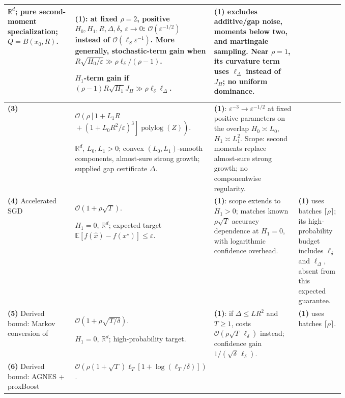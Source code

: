 \begin{table}[tp]
\begin{threeparttable}
\begin{tabularx}{\linewidth}{@{}>{\raggedright\arraybackslash}p{0.20\linewidth}>{\raggedright\arraybackslash}p{0.32\linewidth}>{\raggedright\arraybackslash}p{0.25\linewidth}>{\raggedright\arraybackslash}X@{}}
$\mathbb R^d$; pure second-moment specialization; $Q=B(x_0,R)$.
& \textbf{(1)}: at fixed $\rho=2$, positive $H_0,H_1,R,\Delta,\delta$, $\varepsilon\to0$: $\mathcal{O}(\varepsilon^{-1/2})$ instead of $\mathcal{O}(\ell_S\varepsilon^{-1})$. More generally, stochastic-term gain when $R\sqrt{H_0/\varepsilon}\gg\rho\ell_\delta/(\rho-1)$.\par
$H_1$-term gain if $(\rho-1)R\sqrt{H_1}J_H\gg\rho\ell_\delta\ell_\Delta$.
& \textbf{(1)} excludes additive/gap noise, moments below two, and martingale sampling. Near $\rho=1$, its curvature term uses $\ell_\Delta$ instead of $J_H$; no uniform dominance. \\
\midrule
\textbf{(3)} \citep[App.~I, Thm.~7, v1]{gssgDvinskikh2026}
& $\mathcal{O}\!\left(\rho\left[1+L_1R\right.\right.$\newline
$\left.\left.{}+(1+L_0R^2/\varepsilon)^3\right]\operatorname{polylog}(Z)\right)$.\par
$\mathbb R^d$, $L_0,L_1>0$; convex $(L_0,L_1)$-smooth components, almost-sure strong growth; supplied gap certificate $\Delta$.
& \textbf{(1)}: $\varepsilon^{-3}\to\varepsilon^{-1/2}$ at fixed positive parameters on the overlap $H_0\asymp L_0$, $H_1\asymp L_1^2$. Scope: second moments replace almost-sure strong growth; no componentwise regularity.
& \\
\midrule
\textbf{(4)} Accelerated SGD \citep[Thm.~2]{gssgVaswani2019}
& $\mathcal{O}(1+\rho\sqrt T)$.\par
$H_1=0$, $\mathbb R^d$; expected target $\mathbb E[f(\widehat x)-f(x^\star)]\le\varepsilon$.
& \textbf{(1)}: scope extends to $H_1>0$; matches known $\rho\sqrt T$ accuracy dependence at $H_1=0$, with logarithmic confidence overhead.
& \textbf{(1)} uses batches $\lceil\rho\rceil$; its high-probability budget includes $\ell_\delta$ and $\ell_\Delta$, absent from this expected guarantee. \\
\midrule
\textbf{(5)} Derived bound: Markov conversion of \citep[Thm.~2]{gssgVaswani2019}
& $\mathcal{O}(1+\rho\sqrt{T/\delta})$.\par
$H_1=0$, $\mathbb R^d$; high-probability target.
& \textbf{(1)}: if $\Delta\le LR^2$ and $T\ge1$, costs $\mathcal{O}(\rho\sqrt T\,\ell_\delta)$ instead; confidence gain $1/(\sqrt\delta\,\ell_\delta)$.
& \textbf{(1)} uses batches $\lceil\rho\rceil$. \\
\midrule
\textbf{(6)} Derived bound: AGNES + proxBoost \citep[Thm.~15, v3]{gssgGupta2025}\citep[Thm.~7]{gssgDavis2020}
& $\mathcal{O}\!\left(\rho(1+\sqrt T)\ell_T[1+\log(\ell_T/\delta)]\right)$.\par

\end{tabularx}
\end{threeparttable}
\end{table}
